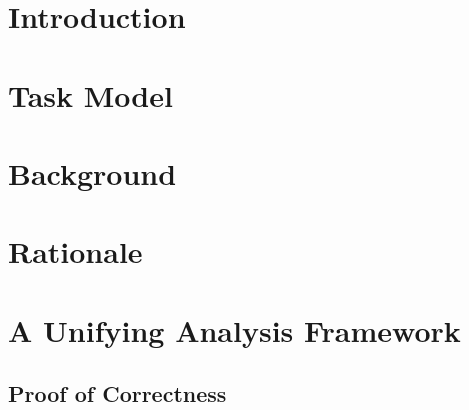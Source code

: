 \documentclass[twoside,titlepage,fleqn,
                pointlessnumbers,headinclude,BCOR5mm,
                ]{scrreprt}
\begin{document}
\frenchspacing
\raggedbottom
{} %
\pagestyle{plain}
%


\cleardoublepage
\pagestyle{scrheadings}
\cleardoublepage





\chapter{Introduction}


\chapter{Task Model}


\chapter{Background}
\label{sec:existing-analyses}


\chapter{Rationale}
\label{sec:rationale}


\chapter{A Unifying Analysis Framework}
\label{sec:analysis}


\section{Proof of Correctness}  
\label{sec:proof-th1}

\end{document}
